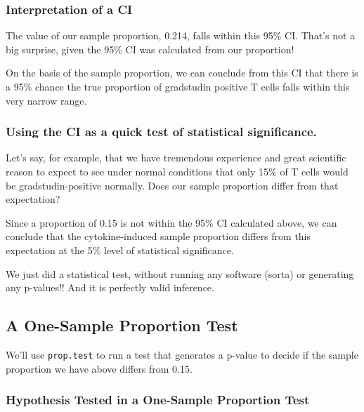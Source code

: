 \documentclass[]{book}
\begin{document}
\hypertarget{interpretation-of-a-ci}{%
\subsubsection{Interpretation of a CI}\label{interpretation-of-a-ci}}

The value of our sample proportion, 0.214, falls within this 95\% CI. That's not a big surprise, given the 95\% CI was calculated from our proportion!

On the basis of the sample proportion, we can conclude from this CI that there is a 95\% chance the true proportion of gradstudin positive T cells falls within this very narrow range.

\hypertarget{using-the-ci-as-a-quick-test-of-statistical-significance.}{%
\subsubsection{Using the CI as a quick test of statistical significance.}\label{using-the-ci-as-a-quick-test-of-statistical-significance.}}

Let's say, for example, that we have tremendous experience and great scientific reason to expect to see under normal conditions that only 15\% of T cells would be gradstudin-positive normally. Does our sample proportion differ from that expectation?

Since a proportion of 0.15 is not within the 95\% CI calculated above, we can conclude that the cytokine-induced sample proportion differs from this expectation at the 5\% level of statistical significance.

We just did a statistical test, without running any software (sorta) or generating any p-values!! And it is perfectly valid inference.

\hypertarget{a-one-sample-proportion-test}{%
\subsection{A One-Sample Proportion Test}\label{a-one-sample-proportion-test}}

We'll use \texttt{prop.test} to run a test that generates a p-value to decide if the sample proportion we have above differs from 0.15.

\hypertarget{hypothesis-tested-in-a-one-sample-proportion-test}{%
\subsubsection{Hypothesis Tested in a One-Sample Proportion Test}\label{hypothesis-tested-in-a-one-sample-proportion-test}}
\end{document}
